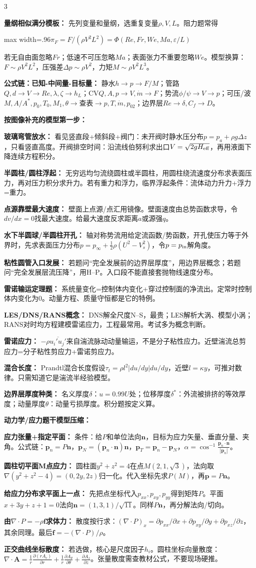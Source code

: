 \documentclass[a4paper]{article}
\newcommand{\ans}[1]{\colorbox{G}{\parbox{\dimexpr\linewidth-2\fboxsep}{#1}}\par}
\newcommand{\sect}[1]{\par{\bfseries\color{Q}#1：}}
\newcommand{\fmlb}[1]{\ans{\begin{adjustbox}{max width=.96\linewidth}$\displaystyle #1$\end{adjustbox}}}
\begin{document}
\begin{multicols}{3}
{\sect{量纲相似满分模板}
先列变量和量纲，选重复变量$\rho,V,L$。阻力题常得
\fmlb{\pi_F=F/(\rho V^2L^2)=\Phi(Re,Fr,We,Ma,\varepsilon/L)}
若无自由面忽略$Fr$；低速不可压忽略$Ma$；表面张力不重要忽略$We$。模型换算：$F\sim\rho V^2L^2$，压强差$\Delta p\sim\rho V^2$，力矩$M\sim\rho V^2L^3$。

\sect{公式链：已知-中间量-目标量}
静水$h\to p\to F/M$；管路$Q,d\to V\to Re,\lambda,\zeta\to h_L$；CV$Q,A,p\to V,\dot m\to F$；势流$\phi/\psi\to V\to p$；可压/波$M,A/A^*,p_0,T_0,M_1,\theta\to$查表$\to p,T,\dot m,p_{02}$；边界层$Re\to\delta,C_f\to D$。

\sect{按图像补充的模型第一步}
\sect{玻璃弯管放水}
看见竖直段+倾斜段+阀门：未开阀时静水压分布$p=p_a+\rho g\Delta z$，只看竖直高度。开阀排空时间：沿流线伯努利求出口$V=\sqrt{2gH_{\rm eff}}$，再用液面下降连续方程积分。
\sect{半圆柱/圆柱浮起}
无穷远均匀流绕圆柱或半圆柱，用圆柱绕流速度分布求表面压力，再对压力积分求升力。若有重力和浮力，临界浮起条件：流体动力升力+浮力=重力。
\sect{点源靠壁最大速度}
壁面上点源/点汇用镜像。壁面速度由总势函数求导，令$dv/dx=0$找最大速度。给最大速度反求距离$a$或源强$q$。
\sect{水下半圆球/半圆柱开孔}
轴对称势流用给定流函数/势函数，开孔使压力等于外界时，先求表面压力分布$p=p_\infty+\frac12\rho(U^2-V_s^2)$，令$p=p_{\rm in}$解角度。
\sect{粘性圆管入口发展}
若题问“完全发展前的边界层厚度”，用边界层概念；若题问“完全发展层流压降”，用H--P。入口段不能直接套抛物线速度分布。
\sect{雷诺输运定理题}
系统量变化=控制体内变化+穿过控制面的净流出。定常时控制体内变化为0。动量方程、质量守恒都是它的特例。
\sect{LES/DNS/RANS概念}
DNS解全尺度N--S，最贵；LES解析大涡、模型小涡；RANS对时均方程建模雷诺应力，工程最常用。考试多为概念判断。
\sect{雷诺应力}
$-\rho\overline{u_i'u_j'}$来自湍流脉动动量输运，不是分子粘性应力。近壁湍流总剪应力=分子粘性剪应力+雷诺剪应力。
\sect{混合长度}
Prandtl混合长度假设$\tau_t=\rho l^2|du/dy|du/dy$，近壁$l=\kappa y$，可推对数律。只需知道它是湍流半经验模型。
\sect{边界层厚度种类}
名义厚度$\delta$：$u=0.99U$处；位移厚度$\delta^*$：外流被排挤的等效厚度；动量厚度$\theta$：动量亏损厚度。积分题按定义算。

\sect{动力学/应力题干模型压缩}
\sect{应力张量+指定平面}
条件：给$P$和单位法向$\bm n$，目标为应力矢量、垂直分量、夹角。公式链：$\bm p_n=P\bm n$，$\bm p_N=(\bm p_n\cdot\bm n)\bm n$，$\bm p_T=\bm p_n-\bm p_N$，$\alpha=\cos^{-1}\frac{\bm p_n\cdot\bm n}{|\bm p_n|}$。
\sect{圆柱切平面M点应力}
圆柱面$y^2+z^2=4$在点$M(2,1,\sqrt3)$，法向取$\nabla(y^2+z^2-4)=(0,2y,2z)$归一化。代入坐标先求$P(M)$，再$\bm p=P\bm n$。
\sect{给应力分布求平面上一点}
先把点坐标代入$p_{xx},p_{xy},p_{yy}$得到矩阵$P$。平面$x+3y+z+1=0$法向$\bm n=(1,3,1)/\sqrt{11}$。同样$P\bm n$，再分解法向/切向。
\sect{由$\nabla\cdot P=-\rho\bm f$求体力}
散度按行求：$(\nabla\cdot P)_x=\partial p_{xx}/\partial x+\partial p_{xy}/\partial y+\partial p_{xz}/\partial z$，其余同理。最后$\bm f=-(\nabla\cdot P)/\rho$。
\sect{正交曲线坐标散度}
若选做，核心是尺度因子$h_i$。圆柱坐标向量散度：$\nabla\cdot\bm A=\frac1r\frac{\partial(rA_r)}{\partial r}+\frac1r\frac{\partial A_\theta}{\partial\theta}+\frac{\partial A_z}{\partial z}$。张量散度需查教材公式，不要现场硬推。

}
\end{multicols}
\end{document}
